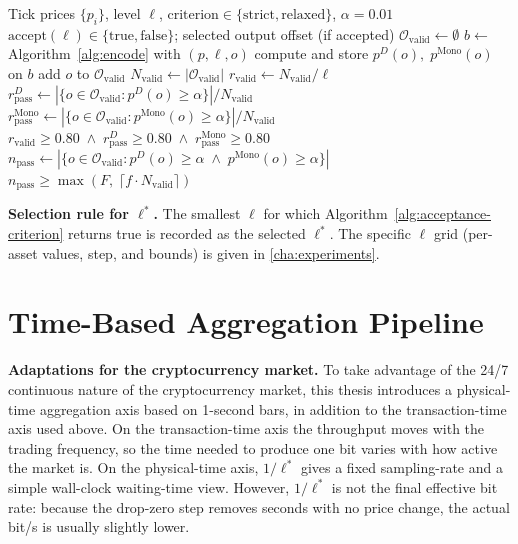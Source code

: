 \documentclass[11pt,titlepage,openany,oneside]{book}  %
\begin{document}
\begin{algorithm}
  \caption{All-offset acceptance check at level $\ell$}
  \label{alg:acceptance-criterion}
  \begin{algorithmic}[1]
    \Require Tick prices $\{p_i\}$, level $\ell$, $\text{criterion} \in \{\text{strict}, \text{relaxed}\}$, $\alpha = 0.01$
    \Ensure $\text{accept}(\ell) \in \{\text{true}, \text{false}\}$; selected output offset (if accepted)
    \State $\mathcal{O}_{\text{valid}} \gets \emptyset$
      \State $b \gets$ Algorithm~\ref{alg:encode} with $(p, \ell, o)$
        \State compute and store $p^{D}(o),\; p^{\text{Mono}}(o)$ on $b$ 
        \State add $o$ to $\mathcal{O}_{\text{valid}}$
      \EndIf
    \EndFor
    \State $N_{\text{valid}} \gets |\mathcal{O}_{\text{valid}}|$
    \State $r_{\text{valid}} \gets N_{\text{valid}} / \ell$
      \State $r_{\text{pass}}^{D} \gets |\{o \in \mathcal{O}_{\text{valid}} : p^{D}(o) \ge \alpha\}| / N_{\text{valid}}$
      \State $r_{\text{pass}}^{\text{Mono}} \gets |\{o \in \mathcal{O}_{\text{valid}} : p^{\text{Mono}}(o) \ge \alpha\}| / N_{\text{valid}}$
      \State \Return $r_{\text{valid}} \ge 0.80 \;\land\; r_{\text{pass}}^{D} \ge 0.80 \;\land\; r_{\text{pass}}^{\text{Mono}} \ge 0.80$
    \EndIf
      \State $n_{\text{pass}} \gets |\{o \in \mathcal{O}_{\text{valid}} : p^{D}(o) \ge \alpha \;\land\; p^{\text{Mono}}(o) \ge \alpha\}|$
      \State \Return $n_{\text{pass}} \ge \max(F,\; \lceil f \cdot N_{\text{valid}} \rceil)$ 
    \EndIf
  \end{algorithmic}
\end{algorithm}

\textbf{Selection rule for $\ell^*$.} The smallest $\ell$ for which Algorithm~\ref{alg:acceptance-criterion} returns true is recorded as the selected $\ell^*$. The specific $\ell$ grid (per-asset values, step, and bounds) is given in \cref{cha:experiments}.

\section{Time-Based Aggregation Pipeline}
\label{sec:time-based-pipeline}

\textbf{Adaptations for the cryptocurrency market.} To take advantage of the 24/7 continuous nature of the cryptocurrency market, this thesis introduces a physical-time aggregation axis based on 1-second bars, in addition to the transaction-time axis used above. On the transaction-time axis the throughput moves with the trading frequency, so the time needed to produce one bit varies with how active the market is. On the physical-time axis, $1/\ell^*$ gives a fixed sampling-rate and a simple wall-clock waiting-time view. However, $1/\ell^*$ is not the final effective bit rate: because the drop-zero step removes seconds with no price change, the actual bit/s is usually slightly lower.
\end{document}
